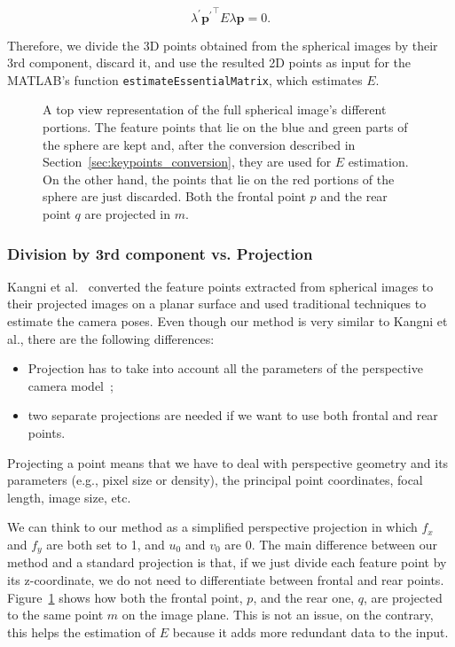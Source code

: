 \begin{equation*}
\lambda^\prime{\mathbf{p}^\prime}^\top E\lambda\mathbf{p} = 0 \text{.}
\end{equation*}

Therefore, we divide the 3D points obtained from the spherical images by their 
3rd component, discard it, and use the resulted 2D points as input for the 
MATLAB's function {\tt estimateEssentialMatrix}, which estimates $E$.

\begin{figure}
    \centering
    \def\svgwidth{0.8\columnwidth}
    
    \caption{A top view representation of the full spherical image's 
    different portions.
    The feature points that lie on the blue and green parts of the sphere are kept and,
    after the conversion described in Section~\ref{sec:keypoints_conversion},
    they are used for $E$ estimation. On the other hand, the points that lie
    on the red portions of the sphere are just discarded.
    Both the frontal point $p$ and the rear point $q$ are projected in $m$.}
	\label{fig:sphere_division}
\end{figure}

\subsubsection{Division by 3rd component vs. Projection}
%
Kangni et al.~\cite{kangni2007orientation} converted the 
feature points extracted from spherical images to their projected images on a 
planar surface and used traditional techniques to estimate the camera poses.
%
Even though our method is very similar to Kangni et al., there are the following
differences:
\begin{itemize}
	\item Projection has to take into account all the parameters of the
	perspective camera model~\cite{szeliski2010computer};
	\item two separate projections are needed if we want to use both
	frontal and rear points.
\end{itemize}
Projecting a point means that we have to deal with perspective geometry and its
parameters (e.g., pixel size or density), the principal point coordinates, 
focal length, image size, etc.

We can think to our method as a simplified perspective projection in which
$f_x$ and $f_y$ are both set to 1, and $u_0$ and $v_0$ are 0.
The main difference between our method and a standard projection is that, if we
just divide each feature point by its z-coordinate, we do not need to 
differentiate between frontal and rear points.
Figure~\ref{fig:sphere_division} shows how both the frontal point, $p$, and the 
rear one, $q$, are projected to the same point $m$ on the image plane.
This is not an issue, on the contrary, this helps the estimation of $E$ because 
it adds more redundant data to the input.

